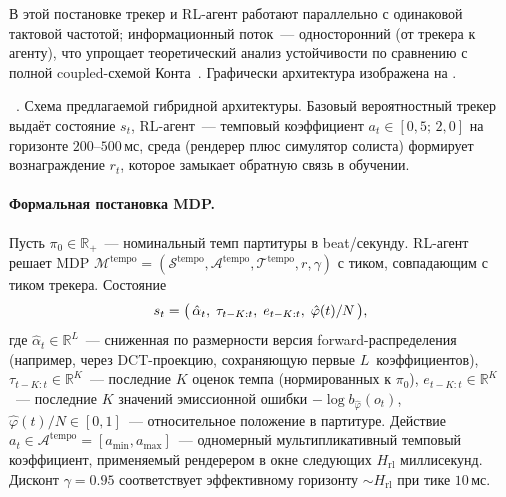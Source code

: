 В этой постановке трекер и RL-агент работают параллельно с
одинаковой тактовой частотой; информационный поток~---
односторонний (от трекера к агенту), что упрощает теоретический
анализ устойчивости по сравнению с полной coupled-схемой
Конта~\cite{Cont2010}. Графически архитектура изображена на
.

\par\addvspace{2pt}
{\centering
{}%
\resizebox{\columnwidth}{!}{}\par
\vspace{2pt}
\footnotesize
\figurename~\thefigure. Схема предлагаемой гибридной
архитектуры. Базовый вероятностный трекер выдаёт состояние
$s_t$, RL-агент~--- темповый коэффициент $a_t \in[0{,}5;\,2{,}0]$
на горизонте $200$--$500$\,мс, среда (рендерер плюс симулятор
солиста) формирует вознаграждение $r_t$, которое замыкает
обратную связь в обучении.\par}
\addvspace{4pt}

\paragraph*{Формальная постановка MDP.} Пусть $\pi_0\in\mathbb{R}_+$~---
номинальный темп партитуры в beat/секунду. RL-агент решает MDP
$\mathcal{M}^{\text{tempo}} = (\mathcal{S}^{\text{tempo}},
\mathcal{A}^{\text{tempo}}, \mathcal{T}^{\text{tempo}}, r,\gamma)$
с тиком, совпадающим с тиком трекера. Состояние
\begin{equation}
s_t = \bigl(\,\hat\alpha_t,\;\tau_{t-K:t},\;
e_{t-K:t},\;\hat\varphi(t)/N\,\bigr),
\eqlab{rl-state-proposal}
\end{equation}
где $\hat\alpha_t\in\mathbb{R}^L$~--- сниженная по размерности
версия forward-распределения (например, через DCT-проекцию,
сохраняющую первые $L$~коэффициентов), $\tau_{t-K:t}\in
\mathbb{R}^K$~--- последние $K$ оценок темпа (нормированных к
$\pi_0$), $e_{t-K:t}\in\mathbb{R}^K$~--- последние $K$ значений
эмиссионной ошибки $-\log b_{\hat\varphi}(o_t)$,
$\hat\varphi(t)/N\in[0,1]$~--- относительное положение в
партитуре. Действие $a_t\in\mathcal{A}^{\text{tempo}} =
[a_{\min}, a_{\max}]$~--- одномерный мультипликативный темповый
коэффициент, применяемый рендерером в окне следующих
$H_{\text{rl}}$ миллисекунд. Дисконт $\gamma=0.95$ соответствует
эффективному горизонту $\sim H_{\text{rl}}$ при тике $10$\,мс.

